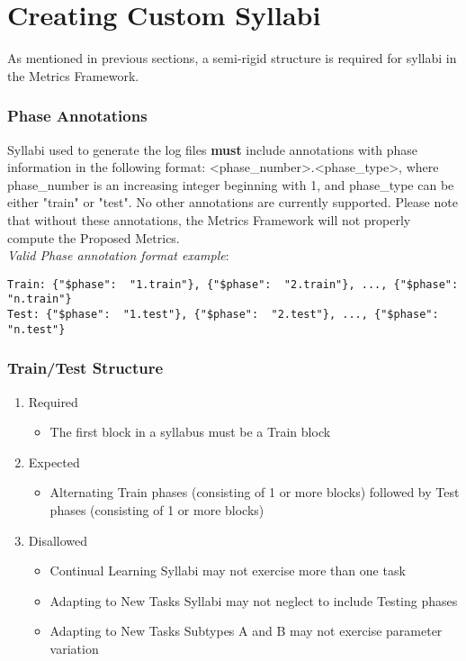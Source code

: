 \chapter{Creating Custom Syllabi}\label{ch:custom_syllabi}

As mentioned in previous sections, a semi-rigid structure is required for syllabi in the Metrics Framework. 

\subsection*{Phase Annotations}

Syllabi used to generate the log files \textbf{must} include annotations with phase information in the following format: <phase\_number>.<phase\_type>, where phase\_number is an increasing integer beginning with 1, and phase\_type can be either "train" or "test". No other annotations are currently supported. Please note that without these annotations, the Metrics Framework will not properly compute the Proposed Metrics. \\[0.1in]


\textit{Valid Phase annotation format example}:\\[0.1in]
\begin{small}
\begin{verbatim}
Train: {"$phase":  "1.train"}, {"$phase":  "2.train"}, ..., {"$phase":  "n.train"}
Test: {"$phase":  "1.test"}, {"$phase":  "2.test"}, ..., {"$phase":  "n.test"}
\end{verbatim}
\end{small}

\subsection*{Train/Test Structure}

\begin{enumerate}
\item Required
\begin{itemize}
\item The first block in a syllabus must be a Train block
\end{itemize}

\item Expected
\begin{itemize}
\item Alternating Train phases (consisting of 1 or more blocks) followed by Test phases (consisting of 1 or more blocks)
\end{itemize}

\item Disallowed
\begin{itemize}
\item Continual Learning Syllabi may not exercise more than one task
\item Adapting to New Tasks Syllabi may not neglect to include Testing phases
\item Adapting to New Tasks Subtypes A and B may not exercise parameter variation
\end{itemize}

\end{enumerate}

